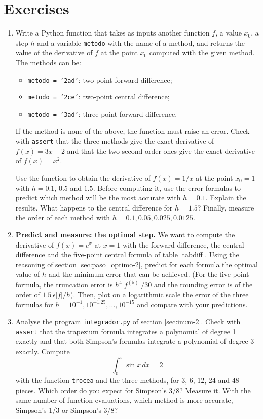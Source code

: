 \section{Exercises}
\begin{enumerate}
\item \label{ej:derivada-en} Write a Python function that takes as inputs another function $f$, a value $x_0$, a step $h$ and a variable \texttt{metodo} with the name of a method, and returns the value of the derivative of $f$ at the point $x_0$ computed with the given method. The methods can be:
\begin{itemize}
\item \texttt{metodo = '2ad'}: two-point forward difference;
\item \texttt{metodo = '2ce'}: two-point central difference;
\item \texttt{metodo = '3ad'}: three-point forward difference.
\end{itemize}
If the method is none of the above, the function must raise an error. Check with \texttt{assert} that the three methods give the exact derivative of $f(x)=3x+2$ and that the two second-order ones give the exact derivative of $f(x)=x^2$.

Use the function to obtain the derivative of $f(x) = 1/x$ at the point $x_0 = 1$ with $h=0.1$, $0.5$ and $1.5$. Before computing it, use the error formulas to predict which method will be the most accurate with $h=0.1$. Explain the results. What happens to the central difference for $h=1.5$? Finally, measure the order of each method with $h=0.1, 0.05, 0.025, 0.0125$.

\item \label{ej:paso_optimo-en} \textbf{Predict and measure: the optimal step.} We want to compute the derivative of $f(x)=e^x$ at $x=1$ with the forward difference, the central difference and the five-point central formula of table \ref{tabdiff}. Using the reasoning of section \ref{sec:paso_optimo-2}, predict for each formula the optimal value of $h$ and the minimum error that can be achieved. (For the five-point formula, the truncation error is $h^4\lvert f^{(5)}\rvert/30$ and the rounding error is of the order of $1.5\,\epsilon\lvert f\rvert/h$). Then, plot on a logarithmic scale the error of the three formulas for $h=10^{-1},10^{-1.25},\dots,10^{-15}$ and compare with your predictions.

\item \label{ej:integra_funcion-en} Analyse the program \texttt{integrador.py} of section \ref{sec:inum-2}. Check with \texttt{assert} that the trapezium formula integrates a polynomial of degree 1 exactly and that both Simpson's formulas integrate a polynomial of degree 3 exactly. Compute
\begin{equation*}
\int_0^{\pi} \sin x\,dx = 2
\end{equation*}
with the function \texttt{trocea} and the three methods, for 3, 6, 12, 24 and 48 pieces. Which order do you expect for Simpson's 3/8? Measure it. With the same number of function evaluations, which method is more accurate, Simpson's 1/3 or Simpson's 3/8?


\end{enumerate}
